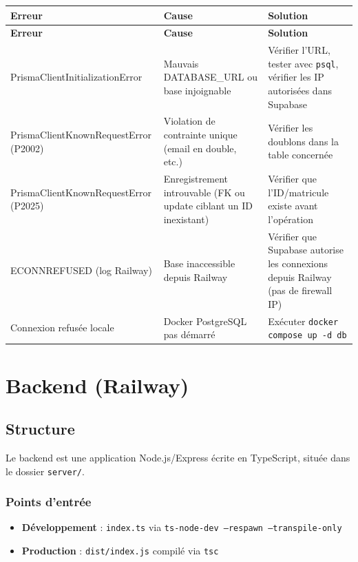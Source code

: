 \documentclass[12pt,a4paper]{report}
\begin{document}
\begin{longtable}{|>{\raggedright\arraybackslash}p{4cm}|>{\raggedright\arraybackslash}p{5cm}|>{\raggedright\arraybackslash}p{5cm}|}
\hline
\textbf{Erreur} & \textbf{Cause} & \textbf{Solution} \\
\hline
\endfirsthead
\hline
\textbf{Erreur} & \textbf{Cause} & \textbf{Solution} \\
\hline
\endhead
PrismaClientInitializationError & Mauvais DATABASE\_URL ou base injoignable & Vérifier l'URL, tester avec \texttt{psql}, vérifier les IP autorisées dans Supabase \\
\hline
PrismaClientKnownRequestError (P2002) & Violation de contrainte unique (email en double, etc.) & Vérifier les doublons dans la table concernée \\
\hline
PrismaClientKnownRequestError (P2025) & Enregistrement introuvable (FK ou update ciblant un ID inexistant) & Vérifier que l'ID/matricule existe avant l'opération \\
\hline
ECONNREFUSED (log Railway) & Base inaccessible depuis Railway & Vérifier que Supabase autorise les connexions depuis Railway (pas de firewall IP) \\
\hline
Connexion refusée locale & Docker PostgreSQL pas démarré & Exécuter \texttt{docker compose up -d db} \\
\hline
\end{longtable}

\chapter{Backend (Railway)}

\section{Structure}
Le backend est une application Node.js/Express écrite en TypeScript, située dans le dossier \texttt{server/}.

\subsection{Points d'entrée}
\begin{itemize}
    \item \textbf{Développement} : \texttt{index.ts} via \texttt{ts-node-dev --respawn --transpile-only}
    \item \textbf{Production} : \texttt{dist/index.js} compilé via \texttt{tsc}
\end{itemize}
\end{document}
